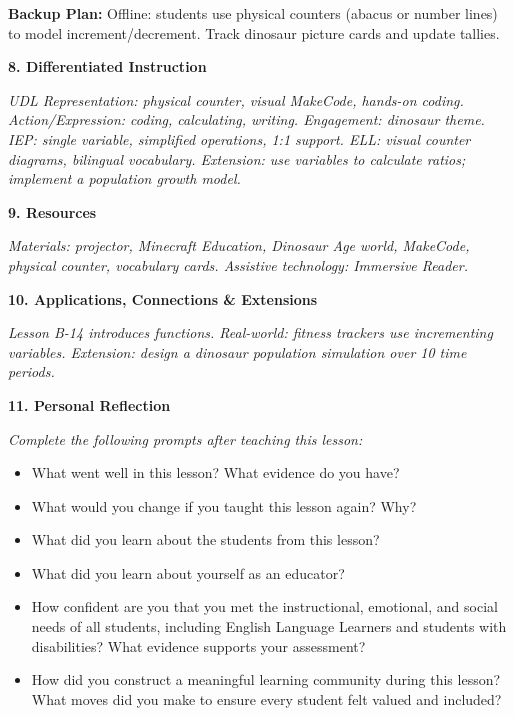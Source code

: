 \documentclass[11pt,letterpaper]{article}
\begin{document}
\textbf{Backup Plan: }Offline: students use physical counters (abacus or number lines) to model increment/decrement. Track dinosaur picture cards and update tallies.

\textbf{8. Differentiated Instruction}

\textit{UDL Representation: physical counter, visual MakeCode, hands-on coding. Action/Expression: coding, calculating, writing. Engagement: dinosaur theme. IEP: single variable, simplified operations, 1:1 support. ELL: visual counter diagrams, bilingual vocabulary. Extension: use variables to calculate ratios; implement a population growth model.}

\textbf{9. Resources}

\textit{Materials: projector, Minecraft Education, Dinosaur Age world, MakeCode, physical counter, vocabulary cards. Assistive technology: Immersive Reader.}

\textbf{10. Applications, Connections \& Extensions}

\textit{Lesson B-14 introduces functions. Real-world: fitness trackers use incrementing variables. Extension: design a dinosaur population simulation over 10 time periods.}

\textbf{11. Personal Reflection}

\textit{Complete the following prompts after teaching this lesson:}

\begin{itemize}
  \item What went well in this lesson? What evidence do you have?

  \item What would you change if you taught this lesson again? Why?

  \item What did you learn about the students from this lesson?

  \item What did you learn about yourself as an educator?

  \item How confident are you that you met the instructional, emotional, and social needs of all students, including English Language Learners and students with disabilities? What evidence supports your assessment?

  \item How did you construct a meaningful learning community during this lesson? What moves did you make to ensure every student felt valued and included?
\end{itemize}
\end{document}
